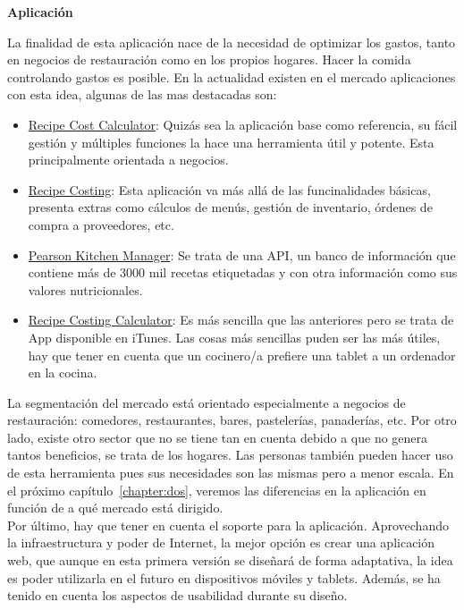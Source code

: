 \documentclass[a4paper,openright,14pt]{book}
\begin{document}
\vspace*{0.2in}
\begin{LARGE}
	\textbf {Aplicación}
\end{LARGE}

\vspace*{0.1in}
La finalidad de esta aplicación nace de la necesidad de optimizar los gastos, tanto en negocios de restauración como en los propios hogares. Hacer la comida controlando gastos es posible. En la actualidad existen en el mercado aplicaciones con esta idea, algunas de las mas destacadas son:
\begin{itemize}
	\item \href{https://recipecostcalculator.net/}{Recipe Cost Calculator}: Quizás sea la aplicación base como referencia, su fácil gestión y múltiples funciones la hace una herramienta útil y potente. Esta principalmente orientada a negocios.
	\item \href{http://www.recipe-costing.com/}{Recipe Costing}: Esta aplicación va más allá de las funcinalidades básicas, presenta extras como cálculos de menús, gestión de inventario, órdenes de compra a proveedores, etc.
	\item \href{http://developer.pearson.com/apis/pearson-kitchen-manager}{Pearson Kitchen Manager}: Se trata de una API, un banco de información que contiene más de 3000 mil recetas etiquetadas y con otra información como sus valores nutricionales.
	\item \href{https://itunes.apple.com/es/app/recipe-costing-calculator/id646877156?mt=8}{Recipe Costing Calculator}: Es más sencilla que las anteriores pero se trata de App disponible en iTunes. Las cosas más sencillas puden ser las más útiles, hay que tener en cuenta que un cocinero/a prefiere una tablet a un ordenador en la cocina.
\end{itemize}
La segmentación del mercado está orientado especialmente a negocios de restauración: comedores, restaurantes, bares, pastelerías, panaderías, etc. Por otro lado, existe otro sector que no se tiene tan en cuenta debido a que no genera tantos beneficios, se trata de los hogares. Las personas también pueden hacer uso de esta herramienta pues sus necesidades son las mismas pero a menor escala. En el próximo capítulo~\ref{chapter:dos}, veremos las diferencias en la aplicación en función de a qué mercado está dirigido.\\

Por último, hay que tener en cuenta el soporte para la aplicación. Aprovechando la infraestructura y poder de Internet, la mejor opción es crear una aplicación web, que aunque en esta primera versión se diseñará de forma adaptativa, la idea es poder utilizarla en el futuro en dispositivos móviles y tablets. Además, se ha tenido en cuenta los aspectos de usabilidad durante su diseño.
\end{document}
